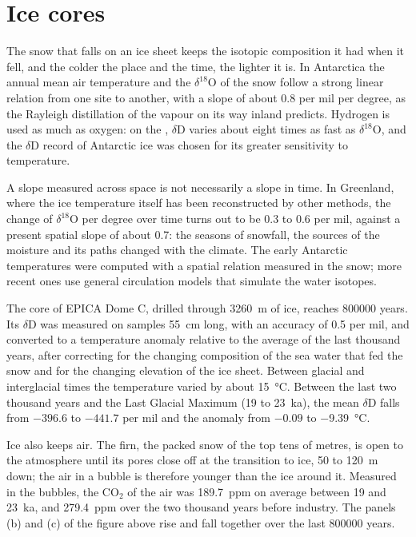 \section{Ice cores}\label{sec:b2:climate-proxies:ice}

The snow that falls on an ice sheet keeps the isotopic composition it had when it fell, and the
colder the place and the time, the lighter it is. In Antarctica the annual mean air temperature and
the $\delta^{18}$O of the snow follow a strong linear relation from one site to another, with a
slope of about \num{0.8} per mil per degree, as the Rayleigh distillation of the vapour on its way
inland predicts. Hydrogen is used as much as oxygen: on the , $\delta$D varies about eight times as fast as $\delta^{18}$O, and
the $\delta$D record of Antarctic ice was chosen for its greater sensitivity to temperature.

A slope measured across space is not necessarily a slope in time. In Greenland, where the ice
temperature itself has been reconstructed by other methods, the change of $\delta^{18}$O per degree
over time turns out to be 0.3 to \num{0.6} per mil, against a present spatial slope of about
\num{0.7}: the seasons of snowfall, the sources of the moisture and its paths changed with the
climate. The early Antarctic temperatures were computed with a spatial relation measured in
the snow; more recent ones use general circulation models that simulate the water isotopes.

The core of EPICA Dome C, drilled through \qty{3260}{m} of ice, reaches \num{800000} years. Its
$\delta$D was measured on samples \qty{55}{cm} long, with an accuracy of \num{0.5} per mil, and
converted to a temperature anomaly relative to the average of the last thousand years, after
correcting for the changing composition of the sea water that fed the snow and for the changing
elevation of the ice sheet. Between glacial and interglacial times the temperature varied by about
\qty{15}{\celsius}. Between the last two thousand years and the Last Glacial Maximum (\num{19} to
\qty{23}{ka}), the mean $\delta$D falls from $-396.6$ to $-441.7$ per mil and the anomaly from
$-0.09$ to \qty{-9.39}{\celsius}.

Ice also keeps air. The firn, the packed snow of the top tens of metres, is open to the
atmosphere until its pores close off at the transition to ice, 50 to \qty{120}{m} down; the air
in a bubble is therefore younger than the ice around it. Measured in the bubbles, the CO$_2$ of the
air was \qty{189.7}{ppm} on average between \num{19} and \qty{23}{ka}, and \qty{279.4}{ppm} over
the two thousand years before industry. The panels (b) and (c) of the figure above rise and fall
together over the last \num{800000} years.

